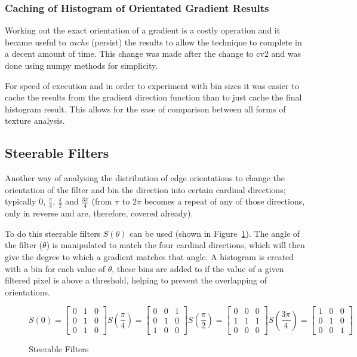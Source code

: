 \subsubsection{Caching of Histogram of Orientated Gradient Results}\label{sec:hog-canning}
Working out the exact orientation of a gradient is a costly operation and it became useful to
\emph{cache} (persist) the results to allow the technique to complete in a decent amount of time.
This change was made after the change to \gls{cv2} and was done using numpy methods for
simplicity. 

For speed of execution and in order to experiment with bin sizes it was easier to cache the 
results from the gradient direction function than to just cache the final histogram result. This
allows for the ease of comparison between all forms of texture analysis.

\subsection{Steerable Filters}
Another way of analysing the distribution of edge orientations to change the orientation of the filter and bin the direction into 
certain cardinal directions; typically $0$, $\frac{\pi}{4}$, $\frac{\pi}{2}$ and $\frac{3\pi}{4}$
(from $\pi$ to $2\pi$ becomes a repeat of any of those directions, only in reverse and are, 
therefore, covered already).

To do this steerable filters $S(\theta)$ can be used (shown in Figure~\ref{fig:steerable-filters}). 
The angle of the filter ($\theta$) is manipulated to match the four cardinal directions, which 
will then give the degree to which a gradient matches that angle. A histogram is created with a
bin for each value of $\theta$, these bins are added to if the value of a given filtered pixel is
above a threshold, helping to prevent the overlapping of orientations.

\begin{figure}[h]
$$
S\left(0\right) = 
\begin{bmatrix}
0 & 1 & 0 \\
0 & 1 & 0 \\
0 & 1 & 0
\end{bmatrix}
S\left(\frac{\pi}{4}\right) =
\begin{bmatrix}
0 & 0 & 1 \\
0 & 1 & 0 \\
1 & 0 & 0
\end{bmatrix}
S\left(\frac{\pi}{2}\right) = 
\begin{bmatrix}
0 & 0 & 0 \\
1 & 1 & 1 \\
0 & 0 & 0
\end{bmatrix}
S\left(\frac{3\pi}{4}\right) = 
\begin{bmatrix}
1 & 0 & 0 \\
0 & 1 & 0 \\
0 & 0 & 1
\end{bmatrix}
$$
\caption{Steerable Filters}
\label{fig:steerable-filters}
\end{figure}

